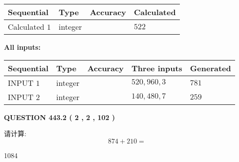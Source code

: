 \documentclass{ctexart}
\begin{document}
   
   
   
\noindent{}
   
   
  
  
\noindent\begin{tabular}{|l|l|l|l|}
\hline
 Sequential & Type & Accuracy & Calculated \\ 
\hline
 
 
  Calculated $  1 $ & integer &  & 
  $ 522 $ 
 \\  \hline  
 \end{tabular}
   
   
   
   
\noindent\vspace{0.1in}\hspace{-0.08in} {\textbf{\Large{All inputs: }}}
   
   
  
  
\noindent\begin{tabular}{|l|l|l|l|l|}
\hline
 Sequential & Type & Accuracy & Three inputs & Generated \\ 
\hline
 
 
  INPUT $  1 $ & integer &  & $
 520
 , 
 960
 , 
 3
 $ & $ 781 $ 
 \\  \hline  
 
 
  INPUT $  2 $ & integer &  & $
 140
 , 
 480
 , 
 7
 $ & $ 259 $ 
 \\  \hline  
 \end{tabular}
   
   
  
\vspace{0.2in}
  
{\textbf{\Large{QUESTION
443.2 
 ( 2 , 2 , 102 )
}}}
  
  
 
请计算:
\begin{equation}
874 +  %
210 = \nonumber
\end{equation}
 
 
 
\noindent{}
 
 

1084
 
 
\noindent{}
 
 

 
 
 
\noindent{}
 
\end{document}
